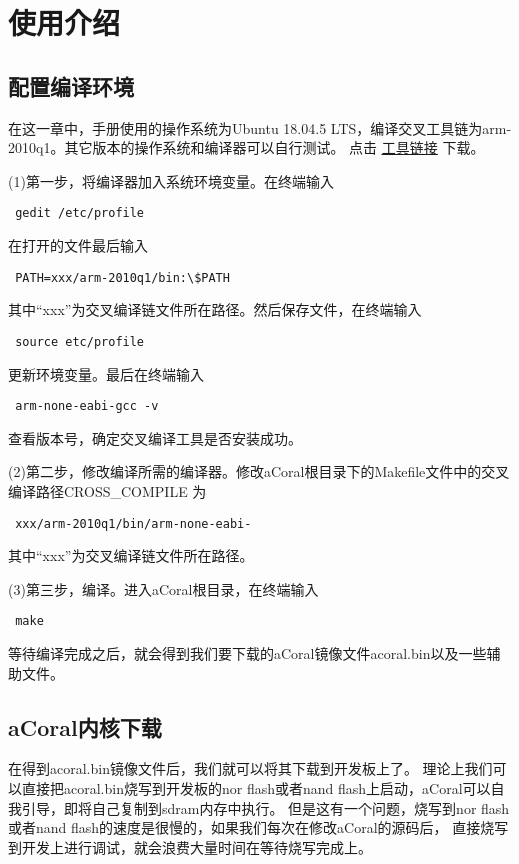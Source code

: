 \chapter{使用介绍}
\section{配置编译环境}

在这一章中，手册使用的操作系统为Ubuntu 18.04.5 LTS，编译交叉工具链为arm-2010q1。其它版本的操作系统和编译器可以自行测试。
点击 \href{https://github.com/spg-one/aCoral1-Tools}{\underline{工具链接}} 下载。

(1)第一步，将编译器加入系统环境变量。在终端输入
\begin{lstlisting}
 gedit /etc/profile   
\end{lstlisting}

在打开的文件最后输入
\begin{lstlisting}
 PATH=xxx/arm-2010q1/bin:\$PATH  
\end{lstlisting}

其中“xxx”为交叉编译链文件所在路径。然后保存文件，在终端输入
\begin{lstlisting}
 source etc/profile
\end{lstlisting}

更新环境变量。最后在终端输入
\begin{lstlisting}
 arm-none-eabi-gcc -v
\end{lstlisting}

查看版本号，确定交叉编译工具是否安装成功。

(2)第二步，修改编译所需的编译器。修改aCoral根目录下的Makefile文件中的交叉编译路径CROSS\_COMPILE 为
\begin{lstlisting}
 xxx/arm-2010q1/bin/arm-none-eabi-
\end{lstlisting}

其中“xxx”为交叉编译链文件所在路径。

(3)第三步，编译。进入aCoral根目录，在终端输入
\begin{lstlisting}
 make
\end{lstlisting}

等待编译完成之后，就会得到我们要下载的aCoral镜像文件acoral.bin以及一些辅助文件。

\section{aCoral内核下载}

在得到acoral.bin镜像文件后，我们就可以将其下载到开发板上了。
理论上我们可以直接把acoral.bin烧写到开发板的nor flash或者nand flash上启动，aCoral可以自我引导，即将自己复制到sdram内存中执行。
但是这有一个问题，烧写到nor flash或者nand flash的速度是很慢的，如果我们每次在修改aCoral的源码后，
直接烧写到开发上进行调试，就会浪费大量时间在等待烧写完成上。

